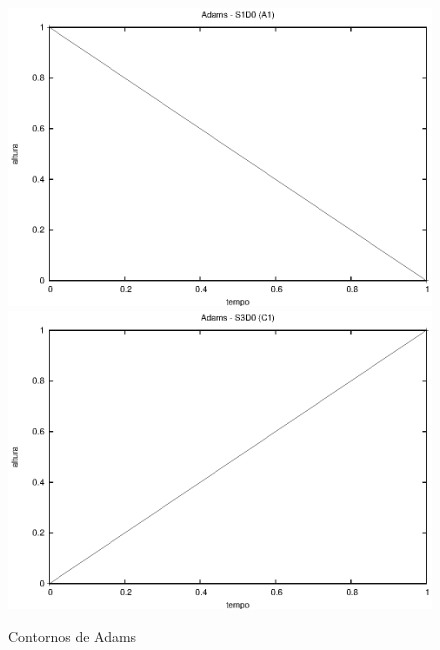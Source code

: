 \documentclass{article}
\begin{document}

\begin{figure}[h]
  \begin{minipage}{1.0\linewidth}
    \includegraphics[scale=.6]{a1}
    \includegraphics[scale=.6]{c1}
    \centering
  \end{minipage}
  \caption{Contornos de Adams}
  \label{fig:adams}
\end{figure}



\end{document}
